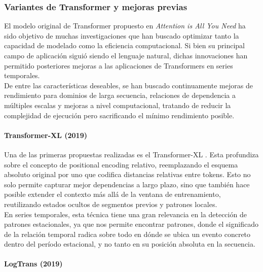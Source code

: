 \subsubsection{Variantes de Transformer y mejoras previas}

El modelo original de Transformer propuesto en \textit{Attention is All You Need} \cite{vaswani2023attentionneed} ha sido objetivo de muchas investigaciones que han buscado optimizar tanto la capacidad de modelado como la eficiencia computacional. Si bien su principal campo de aplicación siguió siendo el lenguaje natural, dichas innovaciones han permitido posteriores mejoras a las aplicaciones de Transformers en series temporales.\\

De entre las características deseables, se han buscado continuamente mejoras de rendimiento para dominios de larga secuencia, relaciones de dependencia a múltiples escalas y mejoras a nivel computacional, tratando de reducir la complejidad de ejecución pero sacrificando el mínimo rendimiento posible.

\paragraph{Transformer-XL (2019)}


Una de las primeras propuestas realizadas es el Transformer-XL \cite{dai2019transformerxlattentivelanguagemodels}. Esta profundiza sobre el concepto de positional encoding relativo, reemplazando el esquema absoluto original por uno que codifica distancias relativas entre tokens. Esto no solo permite capturar mejor dependencias a largo plazo, sino que también hace posible extender el contexto más allá de la ventana de entrenamiento, reutilizando estados ocultos de segmentos previos y patrones locales.\\

En series temporales, esta técnica tiene una gran relevancia en la detección de patrones estacionales, ya que nos permite encontrar patrones, donde el significado de la relación temporal radica sobre todo en dónde se ubica un evento concreto dentro del período estacional, y no tanto en su posición absoluta en la secuencia.

\newpage
\paragraph{LogTrans (2019)}

